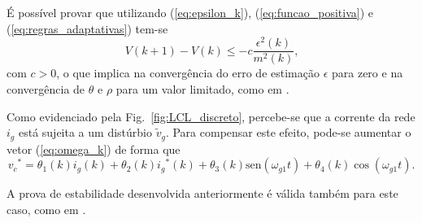     É possível provar que utilizando (\ref{eq:epsilon_k}), (\ref{eq:funcao_positiva})
    e (\ref{eq:regras_adaptativas}) tem-se
    \begin{equation}
        V(k + 1) - V(k) \leq -c \frac{\epsilon^2(k)}{m^2(k)} \text{,}
    \end{equation}
    com $c > 0$, o que implica na convergência do erro de estimação $\epsilon$ para zero
    e na convergência de $\theta$ e $\rho$ para um valor limitado, como em \cite{ref:TAO}.

    Como evidenciado pela Fig.~\ref{fig:LCL_discreto}, percebe-se que a corrente da
    rede $i_g$ está sujeita a um distúrbio $\tilde{v}_g$. Para compensar este efeito,
    pode-se aumentar o vetor (\ref{eq:omega_k}) de forma que
    \begin{equation}
        {v_c}^* = \theta_1(k) i_g(k) + \theta_2(k) {i_g}^*(k)+
            \theta_3(k) \text{sen}(\omega_{g1}t) + \theta_4(k) \cos(\omega_{g1} t) \text{.}
    \end{equation}

    A prova de estabilidade desenvolvida anteriormente é válida também para este caso,
    como em \cite{ref:TAO}.



